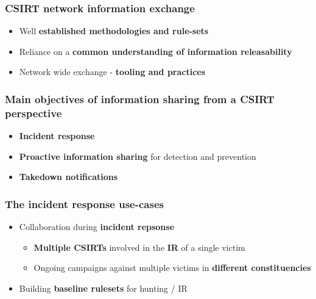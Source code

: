 
\begin{frame}[t,plain]
\titlepage
\end{frame}

\begin{frame}
    \frametitle{CSIRT network information exchange}
    \begin{itemize}
        \item Well {\bf established methodologies and rule-sets}
        \item Reliance on a {\bf common understanding of information releasability}
        \item Network wide exchange - {\bf tooling and practices}
    \end{itemize}

\end{frame}

\begin{frame}
    \frametitle{Main objectives of information sharing from a CSIRT perspective}
    \begin{itemize}
        \item {\bf Incident response}
        \item {\bf Proactive information sharing} for detection and prevention
        \item {\bf Takedown notifications}
    \end{itemize}

\end{frame}

\begin{frame}
    \frametitle{The incident response use-cases}
    \begin{itemize}
        \item Collaboration during {\bf incident repsonse}
        \begin{itemize}
            \item {\bf Multiple CSIRTs} involved in the {\bf IR} of a single victim
            \item Ongoing campaigns against multiple victims in {\bf different constituencies}
        \end{itemize}
        \item Building {\bf baseline rulesets} for hunting / IR
    \end{itemize}

\end{frame}

